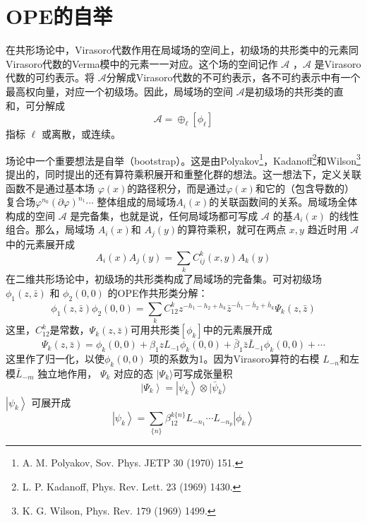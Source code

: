 \section{OPE的自举}
在共形场论中，Virasoro代数作用在局域场的空间上，初级场的共形类中的元素同Virasoro代数的Verma模中的元素一一对应。这个场的空间记作 $\mathcal{A}$ ，$ \mathcal{A}$ 是Virasoro代数的可约表示。将 $\mathcal{A} $分解成Virasoro代数的不可约表示，各不可约表示中有一个最高权向量，对应一个初级场。因此，局域场的空间 $\mathcal{A} $是初级场的共形类的直和，可分解成
$$
\mathcal{A}=\oplus_{\ell}\left[\phi_{\ell}\right]
$$
指标 $\ell$ 或离散，或连续。

场论中一个重要想法是自举（bootstrap）。这是由Polyakov\footnote{A. M. Polyakov, Sov. Phys. JETP 30 (1970) 151.}，Kadanoff\footnote{L. P. Kadanoff, Phys. Rev. Lett. 23 (1969) 1430.}和Wilson\footnote{K. G. Wilson, Phys. Rev. 179 (1969) 1499.}提出的，同时提出的还有算符乘积展开和重整化群的想法。这一想法下，定义关联函数不是通过基本场 $\varphi(x) $的路径积分，而是通过$ \varphi(x) $和它的（包含导数的）复合场$ \varphi^{n_{0}}(\partial \varphi)^{n_{1}} \cdots$ 整体组成的局域场$ A_i(x) $的关联函数间的关系。局域场全体构成的空间 $\mathcal{A}$ 是完备集，也就是说，任何局域场都可写成 $\mathcal{A}$ 的基$ A_i(x)$ 的线性组合。那么，局域场 $A_i(x) $和 $A_j(y) $的算符乘积，就可在两点 $x,y$ 趋近时用 $\mathcal{A}$ 中的元素展开成
$$
A_{i}(x) A_{j}(y)=\sum_{k} C_{i j}^{k}(x, y) A_{k}(y)
$$
在二维共形场论中，初级场的共形类构成了局域场的完备集。可对初级场 $\phi_1(z,\bar{z})$ 和 $\phi_2(0,0)$ 的OPE作共形类分解：
\begin{equation}
	\phi_{1}(z, \bar{z}) \phi_{2}(0,0)=\sum_{k} C_{12}^{k} z^{-h_{1}-h_{2}+h_{k}} \bar{z}^{-\bar{h}_{1}-\bar{h}_{2}+\bar{h}_{k}} \Psi_{k}(z, \bar{z})
\end{equation}
这里，$ C_{12}^{k} $是常数，$ \Psi_{k}(z, \bar{z}) $可用共形类$ [\phi_k] $中的元素展开成
\begin{equation}
	\Psi_{k}(z, \bar{z})=\phi_{k}(0,0)+\beta_{1} z L_{-1} \phi_{k}(0,0)+\bar{\beta}_{1} \bar{z} \bar{L}_{-1} \phi_{k}(0,0)+\cdots
\end{equation}
这里作了归一化，以使$ \phi_{k}(0,0)$ 项的系数为1。因为Virasoro算符的右模 $L_{-n} $和左模$ \bar{L}_{-m}$ 独立地作用， $\Psi_{k}$ 对应的态 $|\Psi_{k}\rangle $可写成张量积
$$
\left|\Psi_{k}\right\rangle=\left|\psi_{k}\right\rangle \otimes |\bar{\psi}_{k} \rangle
$$
$\left|\psi_{k}\right\rangle$ 可展开成
\begin{equation}
	\left|\psi_{k}\right\rangle=\sum_{\{n\}} \beta_{12}^{k\{n\}} L_{-n_{1}} \cdots L_{-n_{p}}\left|\phi_{k}\right\rangle
\end{equation}
